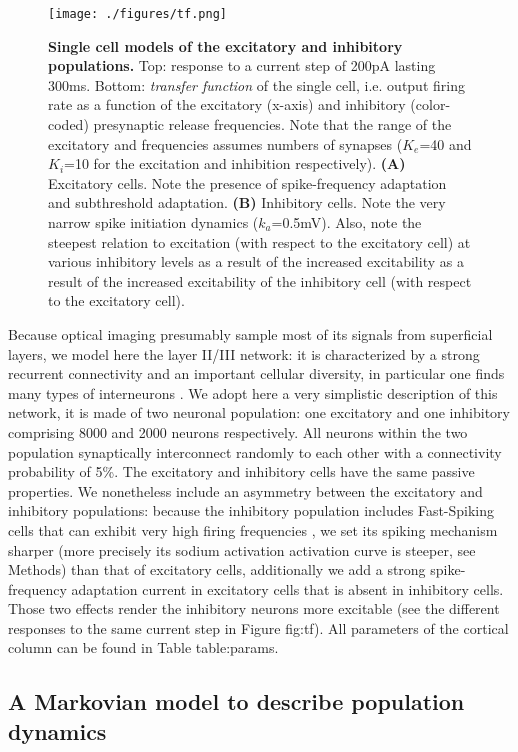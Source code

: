 \documentclass[8pt, colorlinks, a4paper]{article}
\renewcommand\ref{}
\begin{document}
\begin{figure*}
\centering
\texttt{[image: ./figures/tf.png]}
\caption{\label{fig:tf}\textbf{Single cell models of the excitatory and inhibitory populations.} Top: response to a current step of 200pA lasting 300ms. Bottom: \emph{transfer function} of the single cell, i.e. output firing rate as a function of the excitatory (x-axis) and inhibitory (color-coded) presynaptic release frequencies. Note that the range of the excitatory and frequencies assumes numbers of synapses (\(K_e\)=40 and \(K_i\)=10 for the excitation and inhibition respectively).  \textbf{(A)} Excitatory cells. Note the presence of spike-frequency adaptation and subthreshold adaptation. \textbf{(B)} Inhibitory cells. Note the very narrow spike initiation dynamics (\(k_a\)=0.5mV). Also, note the steepest relation to excitation (with respect to the excitatory cell) at various inhibitory levels as a result of the increased excitability as a result of the increased excitability of the inhibitory cell (with respect to the excitatory cell).}
\end{figure*}

Because optical imaging presumably sample most of its signals from
superficial layers, we model here the layer II/III network: it is
characterized by a strong recurrent connectivity and an important
cellular diversity, in particular one finds many types of interneurons
\cite{Markram2004,Ascoli2008a}. We adopt here a very simplistic
description of this network, it is made of two neuronal population:
one excitatory and one inhibitory comprising 8000 and 2000 neurons
respectively. All neurons within the two population synaptically
interconnect randomly to each other with a connectivity probability of
5\%. The excitatory and inhibitory cells have the same passive
properties. We nonetheless include an asymmetry between the excitatory
and inhibitory populations: because the inhibitory population includes
Fast-Spiking cells that can exhibit very high firing frequencies
\cite{Markram2004}, we set its spiking mechanism sharper (more precisely
its sodium activation activation curve is steeper, see Methods) than
that of excitatory cells, additionally we add a strong spike-frequency
adaptation current in excitatory cells that is absent in inhibitory
cells. Those two effects render the inhibitory neurons more excitable
(see the different responses to the same current step in Figure
\ref{fig:tf}). All parameters of the cortical column can be found in Table
\ref{table:params}.

\subsection{A Markovian model to describe population dynamics}
\label{sec-4-2}
\end{document}
